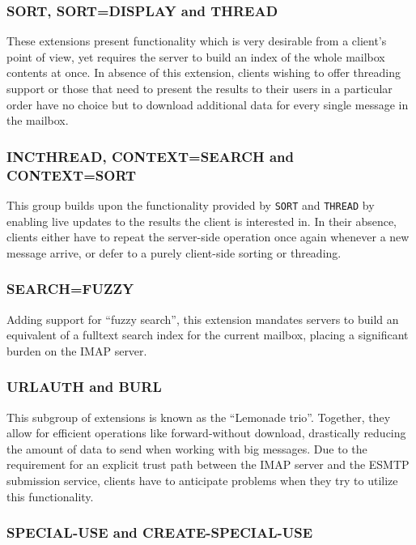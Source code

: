 \documentclass[trojita]{subfiles}
\begin{document}
\subsubsection{SORT, SORT=DISPLAY and THREAD}

These extensions present functionality which is very desirable from a client's point of view, yet requires the server to
build an index of the whole mailbox contents at once.  In absence of this extension, clients wishing to offer threading
support or those that need to present the results to their users in a particular order have no choice but to download
additional data for every single message in the mailbox.

\subsubsection{INCTHREAD, CONTEXT=SEARCH and CONTEXT=SORT}

This group builds upon the functionality provided by {\tt SORT} and {\tt THREAD} by enabling live updates to the results
the client is interested in.  In their absence, clients either have to repeat the server-side operation once again
whenever a new message arrive, or defer to a purely client-side sorting or threading.

\subsubsection{SEARCH=FUZZY}

Adding support for ``fuzzy search'', this extension mandates servers to build an equivalent of a fulltext search index
for the current mailbox, placing a significant burden on the IMAP server.

\subsubsection{URLAUTH and BURL}

This subgroup of extensions is known as the ``Lemonade trio''.  Together, they allow for efficient operations like
forward-without download, drastically reducing the amount of data to send when working with big messages.  Due to the
requirement for an explicit trust path between the IMAP server and the ESMTP submission service, clients have to
anticipate problems when they try to utilize this functionality.

\subsubsection{SPECIAL-USE and CREATE-SPECIAL-USE}
\end{document}
